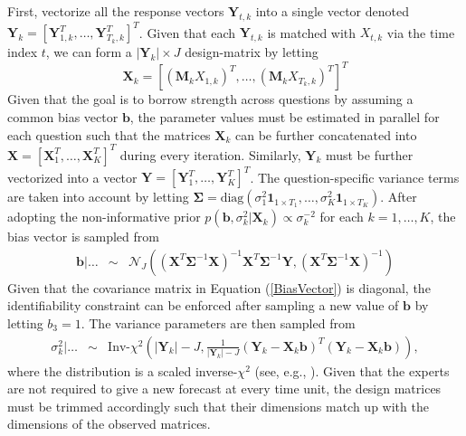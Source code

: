 \documentclass[aoas, preprint]{imsart}
\numberwithin{equation}{section}
\theoremstyle{plain}
\begin{document}
%

\begin{center}
\end{center}
First, vectorize all the response vectors $\boldsymbol{Y}_{t,k}$ into a single vector denoted $\boldsymbol{Y}_k = \left[\boldsymbol{Y}_{1,k}^T, \dots, \boldsymbol{Y}_{T_k,k}^T\right]^T$. Given that each $\boldsymbol{Y}_{t,k}$ is matched with $X_{t,k}$ via the time index $t$, we can form a $|\boldsymbol{Y}_k| \times J$ design-matrix by letting $$\boldsymbol{X}_k = \left[ (\boldsymbol{M}_kX_{1,k})^T, \dots, (\boldsymbol{M}_kX_{T_k,k})^T \right]^T$$ Given that the goal is to borrow strength across questions by assuming a common bias vector $\boldsymbol{b}$, the parameter values must be estimated in parallel for each question such that the matrices $\boldsymbol{X}_k$ can be further concatenated into $\boldsymbol{X} = [\boldsymbol{X}_1^T, \dots, \boldsymbol{X}_K^T]^T$ during every iteration. Similarly, $\boldsymbol{Y}_k$ must be further vectorized into a vector $\boldsymbol{Y} = [\boldsymbol{Y}_1^T, \dots, \boldsymbol{Y}_K^T]^T$. The question-specific variance terms are taken into account by letting $\boldsymbol{\Sigma} = \text{diag}(\sigma^2_1 \boldsymbol{1}_{1 \times T_1}, \dots, \sigma^2_K \boldsymbol{1}_{1 \times T_K})$.  After adopting the non-informative prior $p(\boldsymbol{b}, \sigma_k^2 | \boldsymbol{X}_k) \propto \sigma_k^{-2}$ for each $k = 1, \dots, K$, the bias vector is sampled from
\begin{eqnarray}
\boldsymbol{b} | \dots &\sim& \mathcal{N}_J \left( (\boldsymbol{X}^T \boldsymbol{\Sigma}^{-1} \boldsymbol{X})^{-1} \boldsymbol{X}^T \boldsymbol{\Sigma}^{-1} \boldsymbol{Y}, (\boldsymbol{X}^T \boldsymbol{\Sigma}^{-1} \boldsymbol{X})^{-1} \right) \label{BiasVector}
\end{eqnarray}
Given that the covariance matrix in Equation (\ref{BiasVector}) is diagonal, the identifiability constraint can be enforced after sampling a new value of $\boldsymbol{b}$ by letting $b_3 = 1$. The variance parameters are then sampled from
\begin{eqnarray*}
\sigma^2_k | \dots &\sim& \text{Inv-}\chi^2\left(|\boldsymbol{Y}_k| - J, \frac{1}{|\boldsymbol{Y}_k| - J} (\boldsymbol{Y}_k - \boldsymbol{X}_k \boldsymbol{b})^T (\boldsymbol{Y}_k - \boldsymbol{X}_k \boldsymbol{b}) \right),
\end{eqnarray*}
where the distribution is a scaled inverse-$\chi^2$ (see, e.g., \citet{gelman2003bayesian}). Given that the experts are not required to give a new forecast at every time unit, the design matrices must be trimmed accordingly such that their dimensions match up with the dimensions of the observed matrices. 
\end{document}

